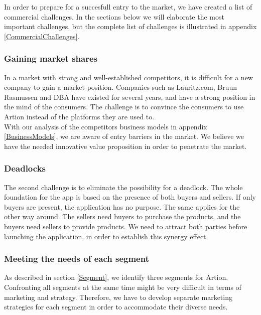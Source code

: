 In order to prepare for a succesfull entry to the market, we have created a list of commercial challenges. In the sections below we will elaborate the most important challenges, but the complete list of challenges is illustrated in appendix \ref{CommercialChallenges}.

\subsubsection{Gaining market shares}
In a market with strong and well-established competitors, it is difficult for a new company to gain a market position. Companies such as Lauritz.com, Bruun Rasmussen and DBA have existed for several years, and have a strong position in the mind of the consumers. The challenge is to convince the consumers to use Artion instead of the platforms they are used to.\\
\forceindent With our analysis of the competitors business models in appendix \ref{BusinessModels}, we are aware of entry barriers in the market. We believe we have the needed innovative value proposition in order to penetrate the market.

\subsubsection{Deadlocks}
The second challenge is to eliminate the possibility for a deadlock. The whole foundation for the app is based on the presence of both buyers and sellers. If only buyers are present, the application has no purpose. The same applies for the other way around. The sellers need buyers to purchase the products, and the buyers need sellers to provide products. We need to attract both parties before launching the application, in order to establish this synergy effect. 

\subsubsection{Meeting the needs of each segment}
As described in section \ref{Segment}, we identify three segments for Artion. Confronting all segments at the same time might be very difficult in terms of marketing and strategy. Therefore, we have to develop separate marketing strategies for each segment in order to accommodate their diverse needs. 
